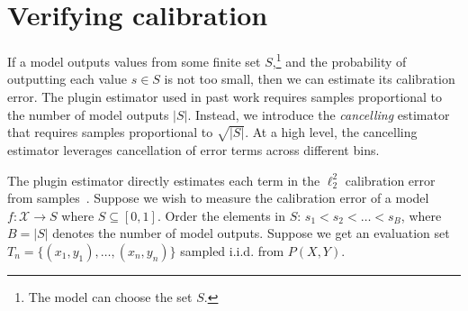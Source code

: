 \section{Verifying calibration}
\label{sec:verifying_calibration}

\newcommand{\pluginEst}[0]{\ensuremath{\hat{E}_{pl}^2}}
\newcommand{\cancelEst}[0]{\ensuremath{\hat{E}^2}}
\newcommand{\ltwoerror}[0]{\ensuremath{{\hat{E}^*}^2}}
\newcommand{\piSmallBound}[0]{\ensuremath{\frac{12}{n}\log{\frac{2B}{\delta}}}}

If a model outputs values from some finite set $S$,\footnote{The model can choose the set $S$.} and the probability of outputting each value $s \in S$ is not too small, then we can estimate its calibration error. The plugin estimator  used in past work requires samples proportional to the number of model outputs $|S|$. Instead, we introduce the \emph{cancelling} estimator that requires samples proportional to $\sqrt{|S|}$. At a high level, the cancelling estimator leverages cancellation of error terms across different bins.



The plugin estimator directly estimates each term in the $\ell_2^2$ calibration error from samples~\cite{nguyen2015posterior, hendrycks2019anomaly, kuleshov2015calibrated, hendrycks2019pretraining}. Suppose we wish to measure the calibration error of a model $f : \mathcal{X} \to S$ where $S \subseteq [0, 1]$. Order the elements in $S$: $s_1 < s_2 < \dots < s_B$, where $B = |S|$ denotes the number of model outputs. Suppose we get an evaluation set $T_n = \{(x_1, y_1), \dots, (x_n, y_n)\}$ sampled i.i.d. from $P(X, Y)$.


